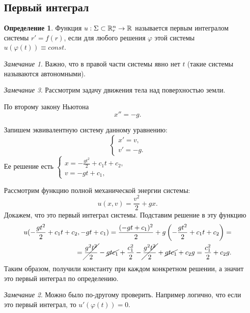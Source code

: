 \documentclass[a5paper, 11pt]{article}
\theoremstyle{definition}
\newtheorem{Def}{Определение}
\theoremstyle{plain}
\theoremstyle{remark}
\newtheorem*{Note}{Замечание}
\begin{document}
	\subsection[18.11.2022]{Первый интеграл}
	\begin{Def}
		Функция $u: \Sigma \subset \mathbb{R}^n_r \rightarrow \mathbb{R}$ называется первым интегралом системы $r' = f(r)$, если для любого решения $\varphi$ этой системы $u(\varphi(t)) \equiv const$. 
	\end{Def}
	\begin{Note}
		Важно, что в правой части системы явно нет $t$ (такие системы называются автономными).
	\end{Note}
	\begin{Note}
		Рассмотрим задачу движения тела над поверхностью земли.
		\begin{figure}[h!]
			\centering
		\end{figure}
		По второму закону Ньютона 
		\[
		x'' = -g.
		\]
	
		Запишем эквивалентную систему данному уравнению:
		\[
		\begin{cases}
			x' = v,\\
			v' = -g.
		\end{cases}
		\]
		Ее решение есть $\begin{cases}
			x = -\frac{gt^2}{2} + c_1t + c_2,\\
			v = -gt + c_1,
		\end{cases}$
		
		Рассмотрим функцию полной механической энергии системы: 
		\[
		u(x,v) = \frac{v^2}{2} + gx.
		\]
		Докажем, что это первый интеграл системы. Подставим решение в эту функцию
		\[
		\begin{split}
		u(-\frac{gt^2}{2} + c_1t + c_2, -gt + c_1) = \frac{(-gt + c_1)^2}{2} + g\left(-\frac{gt^2}{2} + c_1t + c_2\right) = \\
		= \cancel{\frac{g^2t^2}{2}} - \cancel{gtc_1} + \frac{c_1^2}{2} - \cancel{\frac{g^2t^2}{2}} + \cancel{gtc_1} + c_2g = \frac{c_1^2}{2} + c_2g.
		\end{split}
		\] 
		Таким образом, получили константу при каждом конкретном решении, а значит это первый интеграл по определению.
		
		\begin{Note}
			Можно было по-другому проверить. Например логично, что если это первый интеграл, то $u'(\varphi(t)) = 0$.
		\end{Note}
	\end{Note}
\end{document}
